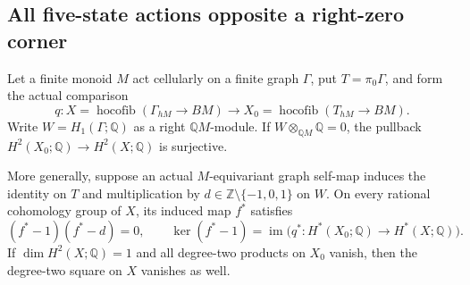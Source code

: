 \subsection{All five-state actions opposite a right-zero corner}

\begin{lemma}
\label{C:graph-component-eigenvalues}
Let a finite monoid $M$ act cellularly on a finite graph $\Gamma$,
put $T=\pi_0\Gamma$, and form the actual comparison
\[
 q:X=\operatorname{hocofib}(\Gamma_{hM}\to BM)
       \longrightarrow
 X_0=\operatorname{hocofib}(T_{hM}\to BM).
\]
Write $W=H_1(\Gamma;\mathbb Q)$ as a right $\mathbb QM$-module.
If $W\otimes_{\mathbb QM}\mathbb Q=0$, the pullback
$H^2(X_0;\mathbb Q)\to H^2(X;\mathbb Q)$ is surjective.

More generally, suppose an actual $M$-equivariant graph self-map
induces the identity on $T$ and multiplication by
$d\in\mathbb Z\setminus\{-1,0,1\}$ on $W$.
On every rational cohomology group of $X$, its induced map $f^*$
satisfies
\[
 (f^*-1)(f^*-d)=0,
 \qquad
 \ker(f^*-1)=\operatorname{im}\bigl(q^*:H^*(X_0;\mathbb Q)
                                   \to H^*(X;\mathbb Q)\bigr).
\]
If $\dim H^2(X;\mathbb Q)=1$ and all degree-two products on $X_0$
vanish, then the degree-two square on $X$ vanishes as well.
\end{lemma}
